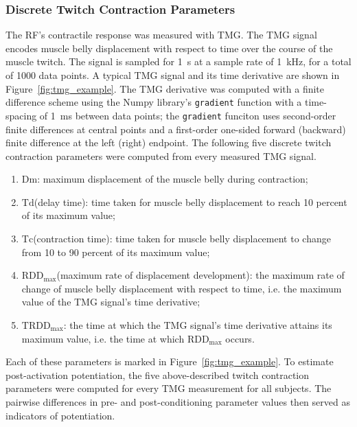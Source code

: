 \documentclass[utf8]{style/FrontiersinHarvard}
\newcommand{\Dm}{\ensuremath{\text{Dm}}\xspace}
\newcommand{\Td}{\ensuremath{\text{Td}}\xspace}
\newcommand{\Tc}{\ensuremath{\text{Tc}}\xspace}
\newcommand{\RDDMax}{\ensuremath{ \text{RDD}_{\text{max}}}\xspace}
\newcommand{\RDDMaxTime}{\ensuremath{ \text{TRDD}_{\text{max}}}\xspace}
\begin{document}
\subsubsection{Discrete Twitch Contraction Parameters} \label{sss:discrete_twitch_params}
The RF's contractile response was measured with TMG.
The TMG signal encodes muscle belly displacement with respect to time over the course of the muscle twitch.
The signal is sampled for \SI{1}{\second} at a sample rate of \SI{1}{\kilo \hertz}, for a total of 1000 data points.
A typical TMG signal and its time derivative are shown in Figure~\ref{fig:tmg_example}.
The TMG derivative was computed with a finite difference scheme using the Numpy library's \texttt{gradient} function with a time-spacing of \SI{1}{\milli \second} between data points;
the \texttt{gradient} funciton uses second-order finite differences at central points and a first-order one-sided forward (backward) finite difference at the left (right) endpoint.
The following five discrete twitch contraction parameters were computed from every measured TMG signal.
\begin{enumerate}

    \item \Dm: maximum displacement of the muscle belly during contraction;

    \item \Td (delay time): time taken for muscle belly displacement to reach 10 percent of its maximum value;

    \item \Tc (contraction time): time taken for muscle belly displacement to change from 10 to 90 percent of its maximum value;

    \item \RDDMax (maximum rate of displacement development): the maximum rate of change of muscle belly displacement with respect to time, i.e. the maximum value of the TMG signal's time derivative;

    \item \RDDMaxTime: the time at which the TMG signal's time derivative attains its maximum value, i.e. the time at which \RDDMax occurs.

\end{enumerate}
Each of these parameters is marked in Figure~\ref{fig:tmg_example}.
To estimate post-activation potentiation, the five above-described twitch contraction parameters were computed for every TMG measurement for all subjects.
The pairwise differences in pre- and post-conditioning parameter values then served as indicators of potentiation.
\end{document}
